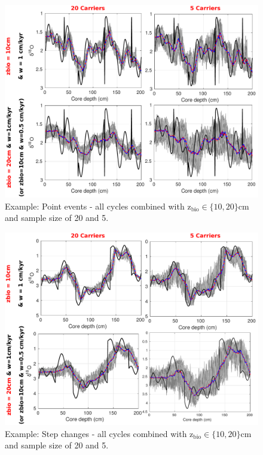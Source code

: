 \documentclass[a4paper,oneside,9pt]{article}
\begin{document}
\begin{figure}[hbp]
\begin{center}
	\includegraphics[width=1.0\textwidth]{../figures/../figures/JustABU_3ycles_combined_pointevents.pdf}
	\caption{Example: Point events - all cycles combined with z$_\mathrm{bio} \in \{10,20 \}$cm and sample size of 20 and 5. }\label{fig:5pointevent}
\end{center}
\end{figure}

\begin{figure}[hbp]
\begin{center}
	\includegraphics[width=1.0\textwidth]{../figures/../figures/JustABU_3ycles_combined_gradual.pdf}
	\caption{Example: Step changes - all cycles combined with z$_\mathrm{bio} \in \{10,20 \}$cm and sample size of 20 and 5. }\label{fig:5pointevent}
\end{center}
\end{figure}
\newpage

% 
\end{document}
